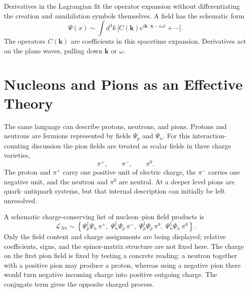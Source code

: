 Derivatives in the Lagrangian fit the operator expansion without differentiating the creation and annihilation symbols themselves. A field has the schematic form
\begin{equation}
\Psi(x)
\sim
\int d^3k\,
\bigl[
C(\mathbf k)e^{i\mathbf k\cdot\mathbf x-i\omega t}
+\cdots
\bigr].
\end{equation}
The operators \(C(\mathbf k)\) are coefficients in this spacetime expansion. Derivatives act on the plane waves, pulling down \(\mathbf k\) or \(\omega\).

\begin{classroomqa}
\end{classroomqa}

\section{Nucleons and Pions as an Effective Theory}

The same language can describe protons, neutrons, and pions. Protons and neutrons are fermions represented by fields \(\Psi_p\) and \(\Psi_n\). For this interaction-counting discussion the pion fields are treated as scalar fields in three charge varieties,
\begin{equation}
\pi^+,
\qquad
\pi^-,
\qquad
\pi^0.
\end{equation}
The proton and \(\pi^+\) carry one positive unit of electric charge, the \(\pi^-\) carries one negative unit, and the neutron and \(\pi^0\) are neutral. At a deeper level pions are quark--antiquark systems, but that internal description can initially be left unresolved.

A schematic charge-conserving list of nucleon--pion field products is
\begin{equation}
\mathcal L_{N\pi}
\sim
\left\{
\Psi_p^\dagger\Psi_n\,\pi^+,\;
\Psi_n^\dagger\Psi_p\,\pi^-,\;
\Psi_p^\dagger\Psi_p\,\pi^0,\;
\Psi_n^\dagger\Psi_n\,\pi^0
\right\}.
\end{equation}
Only the field content and charge assignments are being displayed; relative coefficients, signs, and the spinor-matrix structure are not fixed here. The charge on the first pion field is fixed by testing a concrete reading: a neutron together with a positive pion may produce a proton, whereas using a negative pion there would turn negative incoming charge into positive outgoing charge. The conjugate term gives the opposite charged process.

